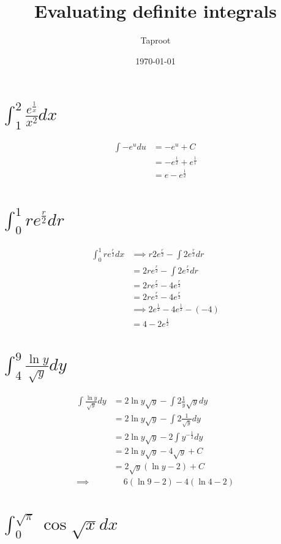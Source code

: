 \documentclass[letterpaper]{article}
\author{Taproot}
\date{\today}
\title{Evaluating definite integrals}
\renewcommand{\tableofcontents}{}
\begin{document}
\tableofcontents

\section{\(\int_{1}^{2} \frac{e^{\frac{1}{x}}}{x^2} dx\)}
\label{sec:org9eb8493}

\[\begin{aligned}
  \int - e^{u} du &= - e^u +C\\
  &= -e^{\frac{1}{2}} + e^{\frac{1}{1}}\\
  &= e-e^{\frac{1}{2}}\\
  \end{aligned}\]
\section{\(\int_{0}^{1} r e^{\frac{r}{2}} dr\)}
\label{sec:org70e60a0}

\[\begin{aligned}
  \int_{0}^{1} r e^{\frac{r}{2}} dx &\implies r 2e^{\frac{r}{2}} - \int 2e^{\frac{r}{2}}dr\\
  &=  2r e^{\frac{r}{2}} - \int 2 e^{\frac{r}{2}}dr\\
  &=  2r e^{\frac{r}{2}} - 4 e^{\frac{r}{2}}\\
  &= 2r e^{\frac{r}{2}} - 4 e^{\frac{r}{2}}\\
  &\implies 2e^{\frac{1}{2}} - 4e^{\frac{1}{2}} - (- 4)\\
  &= 4 - 2e^{\frac{1}{2}}
  \end{aligned}\]

\section{\(\int_{4}^{9} \frac{ \ln  y}{\sqrt{y}} dy\)}
\label{sec:org28e5b5e}

\[\begin{aligned}
  \int \frac{\ln y}{\sqrt{y}} dy &= 2 \ln y \sqrt{y}- \int 2 \frac{1}{y} \sqrt{y} dy\\
  &=  2 \ln y \sqrt{y}- \int 2 \frac{1}{\sqrt{y}} dy\\
  &=  2 \ln y \sqrt{y}- 2 \int y^{-\frac{1}{2}} dy\\
  &=  2 \ln  y \sqrt{y} - 4 \sqrt{y} +C\\
  &=  2 \sqrt{y}(\ln  y - 2) +C\\
  \implies&\ \quad 6( \ln  9 - 2) - 4 ( \ln 4 - 2)
  \end{aligned}\]


\section{\(\int_{0}^{\sqrt{\pi}} \cos \sqrt{x} dx\)}
\label{sec:orga16d6ed}
\end{document}

